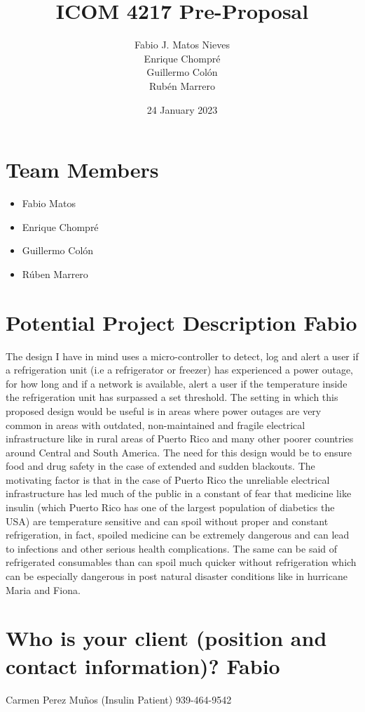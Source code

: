 \documentclass[12pt]{article}
\title{ICOM 4217 Pre-Proposal}
\author{Fabio J. Matos Nieves\\
  Enrique Chompré\\
  Guillermo Colón\\
Rubén Marrero}
\date{24 January 2023}
\begin{document}
\maketitle
\newpage
\thispagestyle{empty}
\pagestyle{plain}
\section{Team Members}
\begin{itemize}
  \item Fabio Matos
  \item Enrique Chompré
  \item Guillermo Colón
  \item Rúben Marrero
\end{itemize} 
\newpage
\section{Potential Project Description Fabio}
The design I have in mind uses a micro-controller to detect, log and alert a user if a refrigeration unit (i.e a refrigerator or freezer) has experienced a power outage, for how long and if a network is available, alert a user if the temperature inside the refrigeration unit has surpassed a set threshold. The setting in which this proposed design would be useful is in areas where power outages are very common in areas with outdated, non-maintained and fragile electrical infrastructure like in rural areas of Puerto Rico and many other poorer countries around Central and South America. The need for this design would be to ensure food and drug safety in the case of extended and sudden blackouts. The motivating factor is that in the case of Puerto Rico the unreliable electrical infrastructure has led much of the public in a constant of fear that medicine like insulin (which Puerto Rico has one of the largest population of diabetics the USA) are temperature sensitive and can spoil without proper and constant refrigeration, in fact, spoiled medicine can be extremely dangerous and can lead to infections and other serious health complications. The same can be said of refrigerated consumables than can spoil much quicker without refrigeration which can be especially dangerous in post natural disaster conditions like in hurricane Maria and Fiona.
\newpage
\section{Who is your client (position and contact information)? Fabio}
Carmen Perez Muños (Insulin Patient) 939-464-9542
\end{document}
